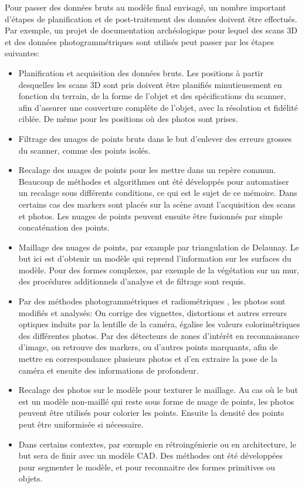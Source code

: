 \documentclass[a4paper,10pt]{scrreprt}
\begin{document}
Pour passer des données bruts au modèle final envisagé, un nombre important d'étapes de planification et de post-traitement des données doivent être effectués. Par exemple, un projet de documentation archéologique pour lequel des scans 3D et des données photogrammétriques sont utilisés peut passer par les étapes suivantes: \cite{Lerm2009}
\begin{itemize}
	\item Planification et acquisition des données bruts. Les positions à partir desquelles les scans 3D sont pris doivent être planifiés minutieusement en fonction du terrain, de la forme de l'objet et des spécifications du scanner, afin d'assurer une couverture complète de l'objet, avec la résolution et fidélité ciblée. De même pour les positions où des photos sont prises.
	\item Filtrage des nuages de points bruts dans le but d'enlever des erreurs grosses du scanner, comme des points isolés.
	\item Recalage des nuages de points pour les mettre dans un repère commun. Beaucoup de méthodes et algorithmes ont été développés pour automatiser un recalage sous différents conditions, ce qui est le sujet de ce mémoire. Dans certains cas des markers sont placés sur la scène avant l'acquisition des scans et photos. Les nuages de points peuvent ensuite être fusionnés par simple concaténation des points.
	\item Maillage des nuages de points, par example par triangulation de Delaunay. Le but ici est d'obtenir un modèle qui reprend l'information sur les surfaces du modèle. Pour des formes complexes, par exemple de la végétation sur un mur, des procédures additionnels d'analyse et de filtrage sont requis.
	\item Par des méthodes photogrammétriques \cite{Tour2009} et radiométriques \cite{Giro2013}, les photos sont modifiés et analysés: On corrige des vignettes, distortions et autres erreurs optiques induits par la lentille de la caméra, égalise les valeurs colorimétriques des différentes photos. Par des détecteurs de zones d'intérêt en reconnaissance d'image, on retrouve des markers, ou d'autres points marquants, afin de mettre en correspondance plusieurs photos et d'en extraire la pose de la caméra et ensuite des informations de profondeur.
	\item Recalage des photos sur le modèle pour texturer le maillage. Au cas où le but est un modèle non-maillé qui reste sous forme de nuage de points, les photos peuvent être utilisés pour colorier les points. Ensuite la densité des points peut être uniformisée si nécessaire.
	\item Dans certains contextes, par exemple en rétroingénierie ou en architecture, le but sera de finir avec un modèle CAD. Des méthodes ont été développées pour segmenter le modèle, et pour reconnaitre des formes primitives ou objets.
\end{itemize}
\end{document}
